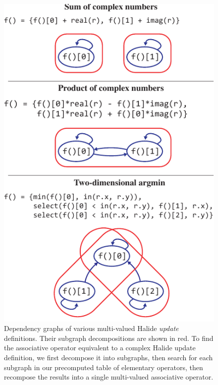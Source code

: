 




\begin{figure}[tb]
\centering
\includegraphics{subgraphs}
\caption{Dependency graphs of various multi-valued Halide \emph{update} definitions. Their subgraph decompositions are shown in red. To find the associative operator equivalent to a complex Halide update definition, we first decompose it into subgraphs, then search for each subgraph in our precomputed table of elementary operators, then recompose the results into a single multi-valued associative operator.}
\label{fig:subgraphs}
\end{figure}

